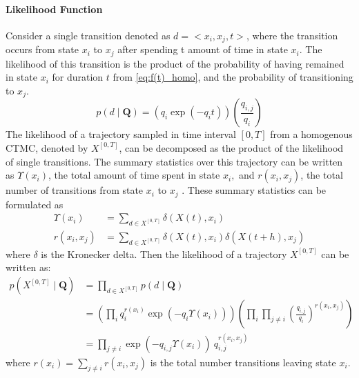 \paragraph*{Likelihood Function}
\label{sec:llh_of_homo}
Consider a single transition denoted as $ d = <x_{i},x_{j},t> $, where the transition occurs from state $ x_{i} $ to $ x_{j} $ after spending t amount of time in state $ x_{i} $. The likelihood of this transition is the product of the probability of having remained in state $ x_{i} $ for duration $ t $ from \autoref{eq:f(t)_homo}, and the probability of transitioning to $ x_{j} $.
\begin{equation}
p(d  \mid \textbf{Q}) = \left( q_{i}\exp(-q_{i}t) \right) \left( \frac{q_{i,j}}{q_{i}} \right)
\end{equation}
The likelihood of a trajectory sampled in time interval $ [0, T] $ from a homogenous CTMC, denoted by $ X^{[0,T]} $, can be decomposed as the product of the likelihood of single transitions. The summary statistics over this trajectory can be written as $ \Upsilon(x_{i}) $, the total amount of time spent in state $ x_{i}, $ and  $ r(x_{i}, x_{j}) $, the total number of transitions from state $ x_{i} $ to $ x_{j} $ \cite{Nodelman2003}. These summary statistics can be formulated as
\begin{align}
\Upsilon(x_i) &= \sum_{d \in X^{[0,T]}} \delta(X(t), x_i) \label{eq:sum_stat_ups}\\
r(x_i,x_j) & = \sum_{d \in X^{[0,T]}} \delta(X(t), x_i) \delta(X(t+h), x_j) \label{eq:sum_stat_r}
\end{align}
where $ \delta $ is the Kronecker delta.
Then the likelihood of a trajectory $  X^{[0,T]} $ can be written as:
\begin{align}
p(X^{[0,T]}  \mid \textbf{Q}) &=  \prod_{d \in X^{[0,T]}} p(d \mid \textbf{Q}) \nonumber\\&=\left(\prod_{ i} q_{i}^{r(x_{i})} \exp \left(-q_{i} \Upsilon(x_{i})\right)\right)\left(\prod_{ i} \prod_{ j \neq i} \left(\frac{q_{i,j}}{q_{i}}\right)^{r(x_{i}, x_{j})}\right) \nonumber\\ & = \prod_{j \neq i}  \exp(-q_{i,j}\Upsilon(x_{i}))\ q_{i,j}^{r(x_{i},x_{j})}
\label{eq:lh_traj_homo}
\end{align}
where $ r(x_{i}) = \sum_{j \neq i} r(x_{i}, x_{j}) $ is the total number transitions leaving state $ x_{i} $.

